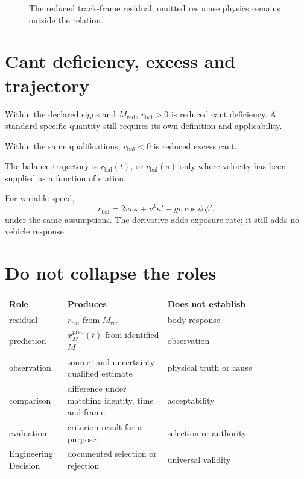 \begin{figure}[htbp]
\centering

\caption{The reduced track-frame residual; omitted response physics remains outside the relation.}
\label{fig:dynamic-balance-relation}
\end{figure}

\section{Cant deficiency, excess and trajectory}

\begin{definition}
\label{def:cant-deficiency}
Within the declared signs and \(M_{\mathrm{red}}\), \(r_{\mathrm{bal}}>0\)
is reduced cant deficiency. A standard-specific quantity still requires its
own definition and applicability.
\end{definition}

\begin{definition}
\label{def:excess-cant}
Within the same qualifications, \(r_{\mathrm{bal}}<0\) is reduced excess cant.
\end{definition}

\begin{definition}
\label{def:dynamics-balance-trajectory}
The balance trajectory is \(r_{\mathrm{bal}}(t)\), or
\(r_{\mathrm{bal}}(s)\) only where velocity has been supplied as a function of
station.
\end{definition}

For variable speed,
\[
\dot r_{\mathrm{bal}}
=2v\dot v\kappa+v^3\kappa'-gv\cos\phi\,\phi',
\]
under the same assumptions. The derivative adds exposure rate; it still adds
no vehicle response.

\section{Do not collapse the roles}

\begin{center}
\small
\begin{tabular}{p{0.19\linewidth}p{0.33\linewidth}p{0.37\linewidth}}
\toprule
Role & Produces & Does not establish\\
\midrule
residual & \(r_{\mathrm{bal}}\) from \(M_{\mathrm{red}}\) & body response\\
prediction & \(x_M^{\mathrm{pred}}(t)\) from identified \(M\) & observation\\
observation & source- and uncertainty-qualified estimate & physical truth or cause\\
comparison & difference under matching identity, time and frame & acceptability\\
evaluation & criterion result for a purpose & selection or authority\\
Engineering Decision & documented selection or rejection & universal validity\\
\bottomrule
\end{tabular}
\end{center}

